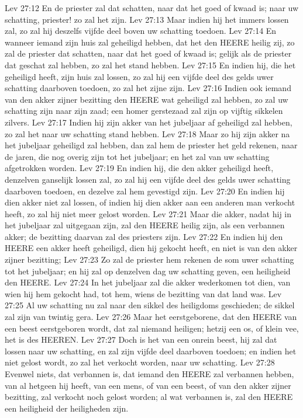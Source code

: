 Lev 27:12  En de priester zal dat schatten, naar dat het goed of kwaad is; naar uw schatting, priester! zo zal het zijn.
Lev 27:13  Maar indien hij het immers lossen zal, zo zal hij deszelfs vijfde deel boven uw schatting toedoen.
Lev 27:14  En wanneer iemand zijn huis zal geheiligd hebben, dat het den HEERE heilig zij, zo zal de priester dat schatten, naar dat het goed of kwaad is; gelijk als de priester dat geschat zal hebben, zo zal het stand hebben.
Lev 27:15  En indien hij, die het geheiligd heeft, zijn huis zal lossen, zo zal hij een vijfde deel des gelds uwer schatting daarboven toedoen, zo zal het zijne zijn.
Lev 27:16  Indien ook iemand van den akker zijner bezitting den HEERE wat geheiligd zal hebben, zo zal uw schatting zijn naar zijn zaad; een homer gerstezaad zal zijn op vijftig sikkelen zilvers.
Lev 27:17  Indien hij zijn akker van het jubeljaar af geheiligd zal hebben, zo zal het naar uw schatting stand hebben.
Lev 27:18  Maar zo hij zijn akker na het jubeljaar geheiligd zal hebben, dan zal hem de priester het geld rekenen, naar de jaren, die nog overig zijn tot het jubeljaar; en het zal van uw schatting afgetrokken worden.
Lev 27:19  En indien hij, die den akker geheiligd heeft, denzelven ganselijk lossen zal, zo zal hij een vijfde deel des gelds uwer schatting daarboven toedoen, en dezelve zal hem gevestigd zijn.
Lev 27:20  En indien hij dien akker niet zal lossen, of indien hij dien akker aan een anderen man verkocht heeft, zo zal hij niet meer gelost worden.
Lev 27:21  Maar die akker, nadat hij in het jubeljaar zal uitgegaan zijn, zal den HEERE heilig zijn, als een verbannen akker; de bezitting daarvan zal des priesters zijn.
Lev 27:22  En indien hij den HEERE een akker heeft geheiligd, dien hij gekocht heeft, en niet is van den akker zijner bezitting;
Lev 27:23  Zo zal de priester hem rekenen de som uwer schatting tot het jubeljaar; en hij zal op denzelven dag uw schatting geven, een heiligheid den HEERE.
Lev 27:24  In het jubeljaar zal die akker wederkomen tot dien, van wien hij hem gekocht had, tot hem, wiens de bezitting van dat land was.
Lev 27:25  Al uw schatting nu zal naar den sikkel des heiligdoms geschieden; de sikkel zal zijn van twintig gera.
Lev 27:26  Maar het eerstgeborene, dat den HEERE van een beest eerstgeboren wordt, dat zal niemand heiligen; hetzij een os, of klein vee, het is des HEEREN.
Lev 27:27  Doch is het van een onrein beest, hij zal dat lossen naar uw schatting, en zal zijn vijfde deel daarboven toedoen; en indien het niet gelost wordt, zo zal het verkocht worden, naar uw schatting.
Lev 27:28  Evenwel niets, dat verbannen is, dat iemand den HEERE zal verbannen hebben, van al hetgeen hij heeft, van een mens, of van een beest, of van den akker zijner bezitting, zal verkocht noch gelost worden; al wat verbannen is, zal den HEERE een heiligheid der heiligheden zijn.

